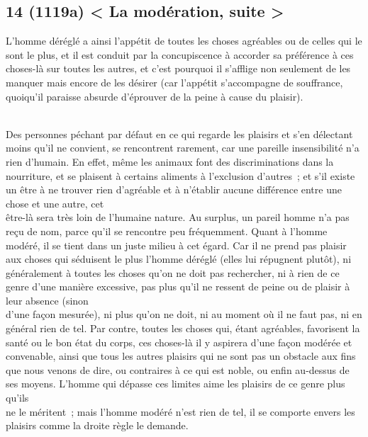 \documentclass[french,twoside]{book} %
\begin{document}
\subsection[{14 (1119a) < La modération, suite >}]{14 (1119a) < La modération, suite >}
\noindent  L’homme déréglé a ainsi l’appétit de toutes les choses agréables ou de celles qui le sont le plus, et il est conduit par la concupiscence à accorder sa préférence à ces choses-là sur toutes les autres, et c’est pourquoi il s’afflige non seulement de les manquer mais encore de les désirer (car l’appétit s’accompagne de souffrance, quoiqu’il paraisse absurde d’éprouver de la peine à cause du plaisir).\par
\\
Des personnes péchant par défaut en ce qui regarde les plaisirs et s’en délectant moins qu’il ne convient, se rencontrent rarement, car une pareille insensibilité n’a rien d’humain. En effet, même les animaux font des discriminations dans la nourriture, et se plaisent à certains aliments à l’exclusion d’autres ; et s’il existe un être à ne trouver rien d’agréable et à n’établir aucune différence entre une chose et une autre, cet \\
être-là sera très loin de l’humaine nature. Au surplus, un pareil homme n’a pas reçu de nom, parce qu’il se rencontre peu fréquemment. Quant à l’homme modéré, il se tient dans un juste milieu à cet égard. Car il ne prend pas plaisir aux choses qui séduisent le plus l’homme déréglé (elles lui répugnent plutôt), ni généralement à toutes les choses qu’on ne doit pas rechercher, ni à rien de ce genre d’une manière excessive, pas plus qu’il ne ressent de peine ou de plaisir à leur absence (sinon \\
d’une façon mesurée), ni plus qu’on ne doit, ni au moment où il ne faut pas, ni en général rien de tel. Par contre, toutes les choses qui, étant agréables, favorisent la santé ou le bon état du corps, ces choses-là il y aspirera d’une façon modérée et convenable, ainsi que tous les autres plaisirs qui ne sont pas un obstacle aux fins que nous venons de dire, ou contraires à ce qui est noble, ou enfin au-dessus de ses moyens. L’homme qui dépasse ces limites aime les plaisirs de ce genre plus qu’ils \\
ne le méritent ; mais l’homme modéré n’est rien de tel, il se comporte envers les plaisirs comme la droite règle le demande.
\end{document}
